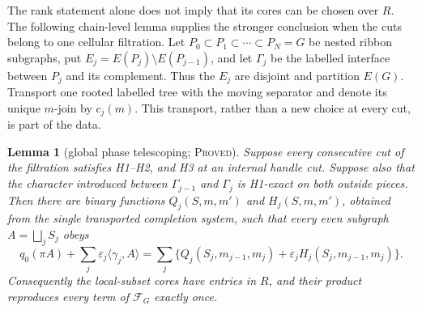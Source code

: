\documentclass[11pt]{article}
\newtheorem{lemma}[theorem]{Lemma}
\newcommand{\cF}{\mathcal F}
\newcommand{\claimtag}[1]{\textsc{#1}}
\newcommand{\proved}{\claimtag{Proved}}
\begin{document}
The rank statement alone does not imply that its cores can be chosen over
\(R\).  The following chain-level lemma supplies the stronger conclusion when
the cuts belong to one cellular filtration.  Let
\(P_0\subset P_1\subset\cdots\subset P_N=G\) be nested ribbon subgraphs,
put \(E_j=E(P_j)\setminus E(P_{j-1})\), and let \(\Gamma_j\) be the labelled
interface between \(P_j\) and its complement.  Thus the \(E_j\) are disjoint
and partition \(E(G)\).  Transport one rooted labelled tree with the moving
separator and denote its unique \(m\)-join by \(c_j(m)\).  This transport,
rather than a new choice at every cut, is part of the data.

\begin{lemma}[global phase telescoping; \proved]\label{lem:phase-telescoping}
Suppose every consecutive cut of the filtration satisfies H1--H2, and H3 at
an internal handle cut.  Suppose also that the character introduced between
\(\Gamma_{j-1}\) and \(\Gamma_j\) is H1-exact on both outside pieces.  Then
there are binary functions \(Q_j(S,m,m')\) and \(H_j(S,m,m')\), obtained from
the single transported completion system, such that every even subgraph
\(A=\bigsqcup_jS_j\) obeys
\begin{equation}\label{eq:global-telescoping}
 q_0(\pi A)+\sum_j\varepsilon_j\langle\gamma_j,A\rangle
 =\sum_j\bigl\{Q_j(S_j,m_{j-1},m_j)
       +\varepsilon_jH_j(S_j,m_{j-1},m_j)\bigr\}.
\end{equation}
Consequently the local-subset cores have entries in \(R\), and their product
reproduces every term of \(\cF_G\) exactly once.
\end{lemma}
\end{document}

